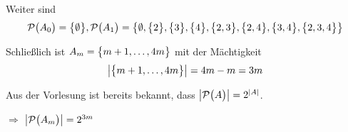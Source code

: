 \documentclass{scrreprt}
\begin{document}
\begin{enumerate}[(a)]
  Weiter sind
  \[
    \mathcal{P}\qty\big(A_0) = \qty\big{\emptyset},
    \mathcal{P}\qty\big(A_1) = \qty\big{
      \emptyset, \qty\big{2}, \qty\big{3}, \qty\big{4},
      \qty\big{2, 3}, \qty\big{2, 4}, \qty\big{3, 4},
      \qty\big{2, 3, 4}
    }
  \]

  Schließlich ist $A_m = \qty\big{m + 1, \ldots, 4m}$ mit der Mächtigkeit
  \[
    \abs{\qty\big{m + 1, \ldots, 4m}} = 4m - m = 3m
  \]

  Aus der Vorlesung ist bereits bekannt, dass
  $\abs{\mathcal{P}\qty\big(A)} = 2^{\abs{A}}$.

  $\Rightarrow$ $\abs{\mathcal{P}\qty\big(A_m)} = 2^{3m}$
\end{enumerate}
\end{document}
